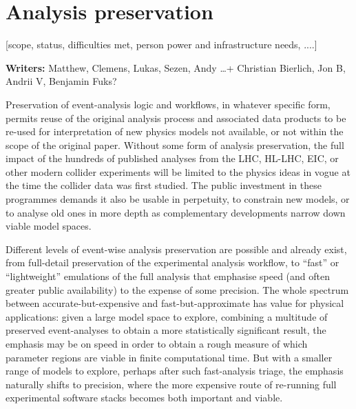 \documentclass[11pt]{article}
\begin{document}
\section{Analysis preservation}


[scope, status, difficulties met, person power and infrastructure needs, ....]

\noindent\textbf{Writers:} Matthew, Clemens, Lukas, Sezen, Andy \dots + Christian Bierlich, Jon B, Andrii V, Benjamin Fuks?



Preservation of event-analysis logic and workflows, in whatever specific form, permits reuse of the original analysis process and associated data products to be re-used for interpretation of new physics models not available, or not within the scope of the original paper. Without some form of analysis preservation, the full impact of the hundreds of published analyses from the LHC, HL-LHC, EIC, or other modern collider experiments will be limited to the physics ideas in vogue at the time the collider data was first studied. The public investment in these programmes demands it also be usable in perpetuity, to constrain new models, or to analyse old ones in more depth as complementary developments narrow down viable model spaces.

Different levels of event-wise analysis preservation are possible and already exist, from full-detail preservation of the experimental analysis workflow, to ``fast'' or ``lightweight'' emulations of the full analysis that emphasise speed (and often greater public availability) to the expense of some precision. The whole spectrum between accurate-but-expensive and fast-but-approximate has value for physical applications: given a large model space to explore, combining a multitude of preserved event-analyses to obtain a more statistically significant result, the emphasis may be on speed in order to obtain a rough measure of which parameter regions are viable in finite computational time. But with a smaller range of models to explore, perhaps after such fast-analysis triage, the emphasis naturally shifts to precision, where the more expensive route of re-running full experimental software stacks becomes both important and viable.
\end{document}
